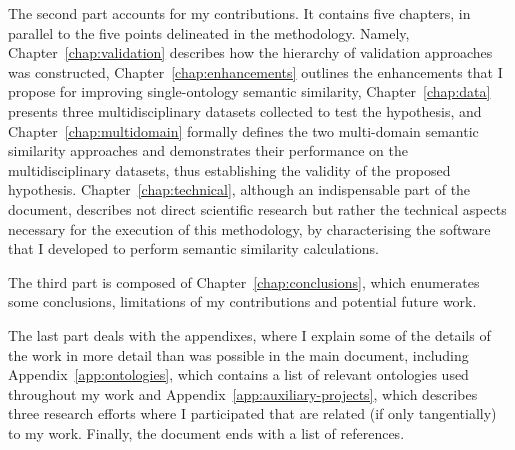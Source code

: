 The second part accounts for my contributions. It contains five chapters, in parallel to the five points delineated in the methodology. Namely, Chapter~\ref{chap:validation} describes how the hierarchy of validation approaches was constructed, Chapter~\ref{chap:enhancements} outlines the enhancements that I propose for improving single-ontology semantic similarity, Chapter~\ref{chap:data} presents three multidisciplinary datasets collected to test the hypothesis, and Chapter~\ref{chap:multidomain} formally defines the two multi-domain semantic similarity approaches and demonstrates their performance on the multidisciplinary datasets, thus establishing the validity of the proposed hypothesis. Chapter~\ref{chap:technical}, although an indispensable part of the document, describes not direct scientific research but rather the technical aspects necessary for the execution of this methodology, by characterising the software that I developed to perform semantic similarity calculations.

The third part is composed of Chapter~\ref{chap:conclusions}, which enumerates some conclusions, limitations of my contributions and potential future work.

The last part deals with the appendixes, where I explain some of the details of the work in more detail than was possible in the main document, including Appendix~\ref{app:ontologies}, which contains a list of relevant ontologies used throughout my work and Appendix~\ref{app:auxiliary-projects}, which describes three research efforts where I participated that are related (if only tangentially) to my work. Finally, the document ends with a list of references.

